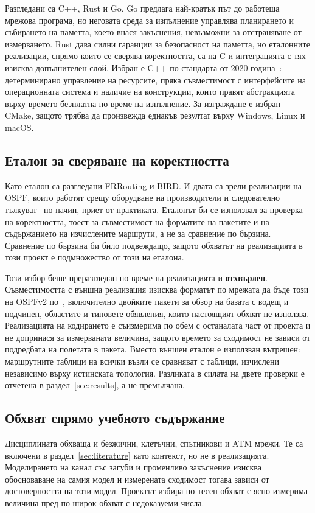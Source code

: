Разгледани са C++, Rust и Go. Go предлага най-кратък път до работеща мрежова програма,
но неговата среда за изпълнение управлява планирането и събирането на паметта, което
внася закъснения, невъзможни за отстраняване от измерването. Rust дава силни гаранции за
безопасност на паметта, но еталонните реализации, спрямо които се сверява коректността,
са на C и интеграцията с тях изисква допълнителен слой. Избран е C++ по стандарта от
2020 година~\cite{iso_cpp20}: детерминирано управление на ресурсите, пряка съвместимост с
интерфейсите на операционната система и наличие на конструкции, които правят
абстракцията върху времето безплатна по време на изпълнение. За изграждане е избран
CMake, защото трябва да произвежда еднакъв резултат върху Windows, Linux и macOS.

\subsection{Еталон за сверяване на коректността}

Като еталон са разгледани FRRouting и BIRD. И двата са зрели реализации на OSPF, които
работят срещу оборудване на производители и следователно тълкуват~\cite{rfc2328} по
начин, приет от практиката. Еталонът би се използвал за проверка на коректността, тоест за
съвместимост на форматите на пакетите и на съдържанието на изчислените маршрути, а не за
сравнение по бързина. Сравнение по бързина би било подвеждащо, защото обхватът на
реализацията в този проект е подмножество от този на еталона.

Този избор беше преразгледан по време на реализацията и \textbf{отхвърлен}. Съвместимостта
с външна реализация изисква форматът по мрежата да бъде този на OSPFv2 по~\cite{rfc2328},
включително двойките пакети за обзор на базата с водещ и подчинен, областите и типовете
обявления, които настоящият обхват не използва. Реализацията на кодирането е съизмерима по
обем с останалата част от проекта и не допринася за измерваната величина, защото времето за
сходимост не зависи от подредбата на полетата в пакета. Вместо външен еталон е използван
вътрешен: маршрутните таблици на всички възли се сравняват с таблици, изчислени независимо
върху истинската топология. Разликата в силата на двете проверки е отчетена в
раздел~\ref{sec:results}, а не премълчана.

\subsection{Обхват спрямо учебното съдържание}

Дисциплината обхваща и безжични, клетъчни, спътникови и ATM мрежи. Те са включени в
раздел~\ref{sec:literature} като контекст, но не в реализацията. Моделирането на канал
със загуби и променливо закъснение изисква обосноваване на самия модел и измерената
сходимост тогава зависи от достоверността на този модел. Проектът избира по-тесен обхват
с ясно измерима величина пред по-широк обхват с недоказуеми числа.
